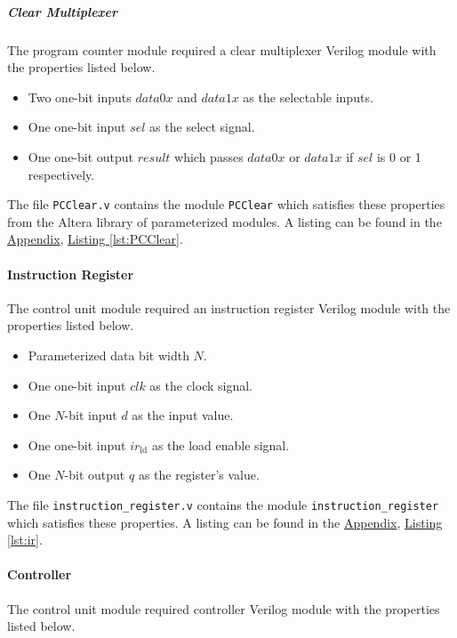 \subparagraph{Clear Multiplexer} \label{subpar:pcclear}

The program counter module required a clear multiplexer Verilog module with the properties listed below.

\begin{itemize}
    \item Two one-bit inputs $data0x$ and $data1x$ as the selectable inputs.
    \item One one-bit input $sel$ as the select signal.
    \item One one-bit output $result$ which passes $data0x$ or $data1x$ if $sel$ is 0 or 1 respectively.
\end{itemize}

The file \verb|PCClear.v| contains the module \verb|PCClear| which satisfies these properties from the Altera library of parameterized modules.
A listing can be found in the \hyperref[sec:appendix]{Appendix}, \hyperref[lst:PCClear]{Listing \ref*{lst:PCClear}}.

\paragraph{Instruction Register} \label{par:ir}

The control unit module required an instruction register Verilog module with the properties listed below.

\begin{itemize}
    \item Parameterized data bit width $N$.
    \item One one-bit input $clk$ as the clock signal.
    \item One $N$-bit input $d$ as the input value.
    \item One one-bit input $ir_\text{ld}$ as the load enable signal.
    \item One $N$-bit output $q$ as the register's value.
\end{itemize}

The file \verb|instruction_register.v| contains the module \verb|instruction_register| which satisfies these properties.
A listing can be found in the \hyperref[sec:appendix]{Appendix}, \hyperref[lst:ir]{Listing \ref*{lst:ir}}.

\paragraph{Controller} \label{par:controller}

The control unit module required controller Verilog module with the properties listed below.

